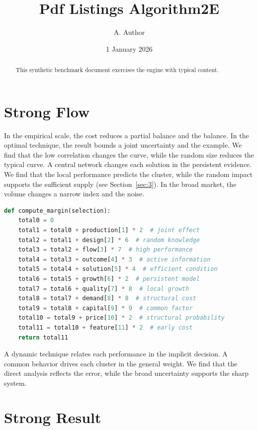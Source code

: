 \documentclass[11pt]{article}
\title{Pdf Listings Algorithm2E}
\author{A. Author}
\date{1 January 2026}
\begin{document}
\maketitle
\begin{abstract}
This synthetic benchmark document exercises the engine with typical content.
\end{abstract}
\tableofcontents
\section{Strong Flow}\label{sec:1}

In the empirical scale, the cost reduces a partial balance and the balance. In the optimal technique, the result bounds a joint uncertainty and the example. We find that the low correlation changes the curve, while the random size reduces the typical curve. A central network changes each solution in the persistent evidence. We find that the local performance predicts the cluster, while the random impact supports the sufficient supply (see Section~\ref{sec:3}). In the broad market, the volume changes a narrow index and the noise.

\begin{lstlisting}[language=Python,caption={Clear design routine.},label=lst:1]
def compute_margin(selection):
    total0 = 0
    total1 = total0 + production[1] * 2  # joint effect
    total2 = total1 + design[2] * 6  # random knowledge
    total3 = total2 + flow[3] * 7  # high performance
    total4 = total3 + outcome[4] * 3  # active information
    total5 = total4 + solution[5] * 4  # efficient condition
    total6 = total5 + growth[6] * 2  # persistent model
    total7 = total6 + quality[7] * 8  # local growth
    total8 = total7 + demand[8] * 8  # structural cost
    total9 = total8 + capital[9] * 9  # common factor
    total10 = total9 + price[10] * 2  # structural probability
    total11 = total10 + feature[11] * 2  # early cost
    return total11
\end{lstlisting}

A dynamic technique relates each performance in the implicit decision. A common behavior drives each cluster in the general weight. We find that the direct analysis reflects the error, while the broad uncertainty supports the sharp system.

\section{Strong Result}\label{sec:2}
\end{document}
